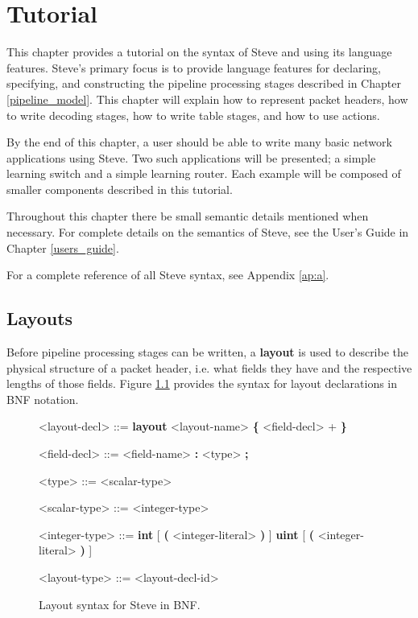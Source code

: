 \chapter{Tutorial} \label{tutorial}

This chapter provides a tutorial on the syntax of Steve and using its language features. Steve's primary focus is to provide language features for declaring, specifying, and constructing the pipeline processing stages described in Chapter \ref{pipeline_model}. This chapter will explain how to represent packet headers, how to write decoding stages, how to write table stages, and how to use actions.

By the end of this chapter, a user should be able to write many basic network applications using Steve. Two such applications will be presented; a simple learning switch and a simple learning router. Each example will be composed of smaller components described in this tutorial. 

Throughout this chapter there be small semantic details mentioned when necessary. For complete details on the semantics of Steve, see the User's Guide in Chapter \ref{users_guide}.

For a complete reference of all Steve syntax, see Appendix \ref{ap:a}.

\section{Layouts} \label{layout_tut}

Before pipeline processing stages can be written, a \textbf{layout} is used to describe the physical structure of a packet header, i.e. what fields they have and the respective lengths of those fields. Figure \ref{fg:layout_syntax} provides the syntax for layout declarations in BNF notation.

\begin{figure}
\begin{mdframed}
\begin{grammar}

<layout-decl> ::=
\textbf{layout} <layout-name> 
\textbf{\{}
	<field-decl> +
\textbf{\}}

<field-decl> ::=
<field-name> \textbf{:} <type> \textbf{;}

<type> ::=
<scalar-type>

<scalar-type> ::= <integer-type>

<integer-type> ::=
\textbf{int} [ \textbf{(} <integer-literal> \textbf{)} ]
\alt \textbf{uint} [ \textbf{(} <integer-literal> \textbf{)} ]

<layout-type> ::=
<layout-decl-id>

\end{grammar}
\end{mdframed}
\caption{Layout syntax for Steve in BNF.}
\label{fg:layout_syntax}
\end{figure}


